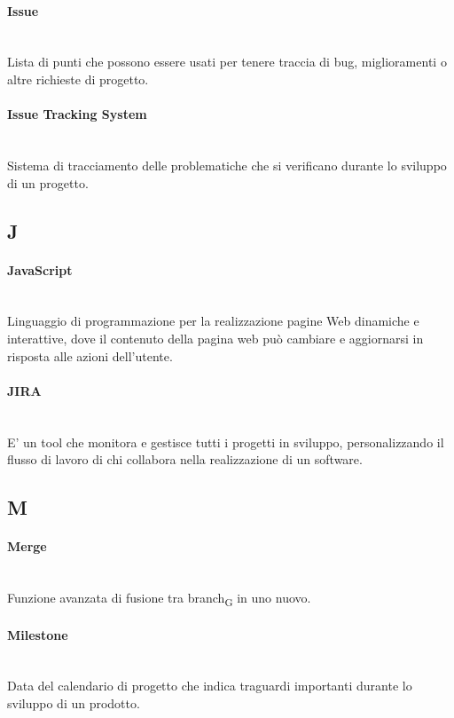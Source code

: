 \paragraph{Issue}~\smallskip \\
Lista di punti che possono essere usati per tenere traccia di bug, miglioramenti o altre richieste di progetto.

\paragraph{Issue Tracking System}~\smallskip \\
Sistema di tracciamento delle problematiche che si verificano durante lo sviluppo di un progetto.
\newpage
{}
\subsection*{J}
\paragraph{JavaScript}~\smallskip \\
Linguaggio di programmazione per la realizzazione pagine Web dinamiche e interattive, dove il contenuto della pagina web può cambiare e aggiornarsi in risposta alle azioni dell'utente.

\paragraph{JIRA}~\smallskip \\
E' un tool che monitora e gestisce tutti i progetti in sviluppo, personalizzando il flusso di lavoro di chi collabora nella realizzazione di un software.

\newpage
{}
\subsection*{M}

\paragraph{Merge}~\smallskip \\
Funzione avanzata di fusione tra branch\textsubscript{G} in uno nuovo.

\paragraph{Milestone}~\smallskip \\
Data del calendario di progetto che indica traguardi importanti durante lo sviluppo di un prodotto.

